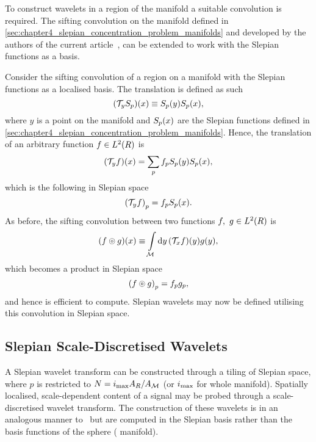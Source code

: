 To construct wavelets in a region of the manifold a suitable convolution is required.
The sifting convolution on the manifold defined in \cref{sec:chapter4_slepian_concentration_problem_manifolds} and developed by the authors of the current article~\cite{Roddy2021}, can be extended to work with the Slepian functions as a basis.

Consider the sifting convolution of a region on a manifold with the Slepian functions as a localised basis.
The translation is defined as such
%
\begin{equation}
	(\mathcal{T}_{y}{S}_{p})(x)
	\equiv {S}_{p}(y) {S}_{p}(x),
\end{equation}
%
where \(y\) is a point on the manifold and \({S}_{p}(x)\) are the Slepian functions defined in \cref{sec:chapter4_slepian_concentration_problem_manifolds}.
Hence, the translation of an arbitrary function \(f \in L^{2}(R)\) is
%
\begin{equation}
	(\mathcal{T}_{y}f)(x)
	= \sum\limits_{p} {f}_{p} {S}_{p}(y) {S}_{p}(x),
\end{equation}
%
which is the following in Slepian space
%
\begin{equation}
	{(\mathcal{T}_{y}f)}_{p}
	= {f}_{p} {S}_{p}(x).
\end{equation}
%
As before, the sifting convolution between two functions \(f,\ g \in L^{2}(R)\) is
%
\begin{equation}
	(f \circledcirc{} g)(x)
	\equiv \int\limits_{\mathcal{M}} \dd{y} (\mathcal{T}_{x}f)(y) g(y),
\end{equation}
%
which becomes a product in Slepian space
%
\begin{equation}
	{(f \circledcirc{} g)}_{p}
	= {f}_{p} {g}_{p},
\end{equation}
%
and hence is efficient to compute.
Slepian wavelets may now be defined utilising this convolution in Slepian space.

\subsection{Slepian Scale-Discretised Wavelets}\label{sec:chapter4_slepian_scale_discretised_wavelets}

A Slepian wavelet transform can be constructed through a tiling of Slepian space, where \(p\) is restricted to \(N=i_{\text{max}} A_{R}/A_{\mathcal{M}}\) (or \(i_{\text{max}}{}\) for whole manifold).
Spatially localised, scale-dependent content of a signal may be probed through a scale-discretised wavelet transform.
The construction of these wavelets is in an analogous manner to~\cite{Wiaux2008,McEwen2018} but are computed in the Slepian basis rather than the basis functions of the sphere (\cf{} manifold).

